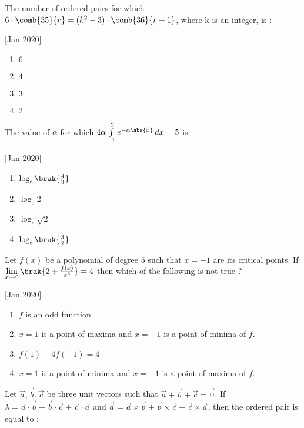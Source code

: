     \item The number of ordered pairs  for which $6\cdot\comb{35}{r}=(k^2-3)\cdot\comb{36}{r+1}$, where k is an integer, is :
    
    \hfill[Jan 2020]
        \begin{enumerate}
            \item $6$
            \item $4$
            \item $3$
            \item $2$
        \end{enumerate}

    \item The value of $\alpha$ for which $4\alpha\int\limits_{-1}^{2}e^{-\alpha\abs{x}}\,dx=5$ is:
    
    \hfill[Jan 2020]
        \begin{enumerate}
            \item $\log_e\brak{\frac{4}{3}}$
            \item $\log_e2$
            \item $\log_e\sqrt{2}$
            \item $\log_e\brak{\frac{3}{2}}$
        \end{enumerate}

    \item Let $f(x)$ be a polynomial of degree $5$ such that $x=\pm1$ are its critical points. If $\lim\limits_{x\to0}\brak{2+\frac{f(x)}{x^3}}=4$ then which of the following is not true ?
    
    \hfill[Jan 2020]
        \begin{enumerate}
            \item $f$ is an odd function
            \item $x=1$ is a point of maxima and $x=-1$ is a point of minima of $f$.
            \item $f(1)-4f(-1)=4$
            \item $x=1$ is a point of minima and $x=-1$ is a point of maxima of $f$.
        \end{enumerate}

    \item Let $\vec{a},\vec{b},\vec{c}$ be three unit vectors such that $\vec{a}+\vec{b}+\vec{c}=\vec{0}$. If $\lambda=\vec{a}\cdot\vec{b}+\vec{b}\cdot\vec{c}+\vec{c}\cdot\vec{a}$ and $\vec{d}=\vec{a}\times\vec{b}+\vec{b}\times\vec{c}+\vec{c}\times\vec{a}$, then the ordered pair  is equal to :
    
